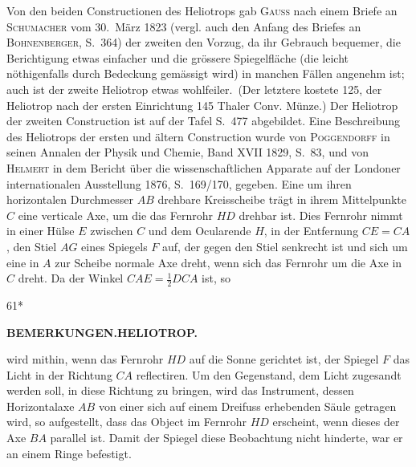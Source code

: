 Von den beiden Constructionen des Heliotrops gab \textsc{Gauss} nach einem Briefe an \textsc{Schumacher} vom
30.~März 1823 (vergl. auch den Anfang des Briefes an \textsc{Bohnenberger}, S.~364) der zweiten den Vorzug, \glqq da
ihr Gebrauch bequemer, die Berichtigung etwas einfacher und die grössere Spiegelfläche (die leicht nöthigenfalls
durch Bedeckung gemässigt wird) in manchen Fällen angenehm ist; auch ist der zweite Heliotrop
etwas wohlfeiler.\grqq\ (Der letztere kostete 125, der Heliotrop nach der ersten Einrichtung 145 Thaler Conv.
Münze.) Der Heliotrop der zweiten Construction ist auf der Tafel S.~477 abgebildet. Eine Beschreibung
des Heliotrops der ersten und ältern Construction wurde von \textsc{Poggendorff} in seinen Annalen der Physik
und Chemie, Band XVII 1829, S.~83, und von \textsc{Helmert} in dem Bericht über die wissenschaftlichen Apparate
auf der Londoner internationalen Ausstellung 1876, S.~169/170, gegeben. Eine um ihren horizontalen
Durchmesser $AB$ drehbare Kreisscheibe trägt in ihrem Mittelpunkte $C$ eine
verticale Axe, um die das Fernrohr $HD$ drehbar ist. Dies Fernrohr nimmt
in einer Hülse $E$ zwischen $C$ und dem Ocularende $H$, in der Entfernung
$CE=CA$, den Stiel $AG$ eines Spiegels $F$ auf, der gegen den Stiel senkrecht
ist und sich um eine in $A$ zur Scheibe normale Axe dreht, wenn sich das
Fernrohr um die Axe in $C$ dreht. Da der Winkel $CAE=\frac12 DCA$ ist, so
\par\endgroup
\begin{center}
\end{center}
\vfill\noindent\hfill61*

\clearpage
\noindent{}\hfill{\small\textbf{BEMERKUNGEN.\quad HELIOTROP.}}\hfill\null\par\medskip
\begingroup\small
\noindent wird mithin, wenn das Fernrohr $HD$ auf die Sonne gerichtet ist, der Spiegel $F$ das Licht in der Richtung
$CA$ reflectiren. Um den Gegenstand, dem Licht zugesandt werden soll, in diese Richtung zu bringen, wird
das Instrument, dessen Horizontalaxe $AB$ von einer sich auf einem Dreifuss erhebenden Säule getragen
wird, so aufgestellt, dass das Object im Fernrohr $HD$ erscheint, wenn dieses der Axe $BA$ parallel ist.
Damit der Spiegel diese Beobachtung nicht hinderte, war er an einem Ringe befestigt.

